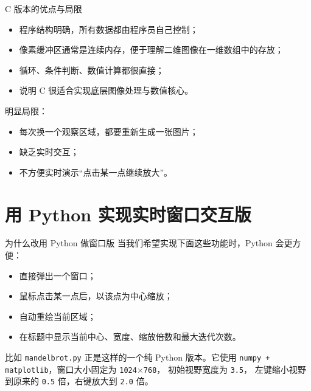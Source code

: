 \documentclass[aspectratio=169,11pt]{ctexbeamer}
\begin{document}
\begin{frame}{C 版本的优点与局限}

\begin{itemize}
  \item 程序结构明确，所有数据都由程序员自己控制；
  \item 像素缓冲区通常是连续内存，便于理解二维图像在一维数组中的存放；
  \item 循环、条件判断、数值计算都很直接；
  \item 说明 C 很适合实现底层图像处理与数值核心。
\end{itemize}

明显局限：

\begin{itemize}
  \item 每次换一个观察区域，都要重新生成一张图片；
  \item 缺乏实时交互；
  \item 不方便实时演示“点击某一点继续放大”。
\end{itemize}
\end{frame}

\section{用 Python 实现实时窗口交互版}

\begin{frame}{为什么改用 Python 做窗口版}
当我们希望实现下面这些功能时，Python 会更方便：

\begin{itemize}
  \item 直接弹出一个窗口；
  \item 鼠标点击某一点后，以该点为中心缩放；
  \item 自动重绘当前区域；
  \item 在标题中显示当前中心、宽度、缩放倍数和最大迭代次数。
\end{itemize}

\vspace{0.5em}
比如 \texttt{mandelbrot.py} 正是这样的一个纯 Python 版本。它使用
\texttt{numpy + matplotlib}，窗口大小固定为 \texttt{1024$\times$768}，
初始视野宽度为 \texttt{3.5}，
左键缩小视野到原来的 \texttt{0.5} 倍，右键放大到 \texttt{2.0} 倍。
\end{frame}
\end{document}
